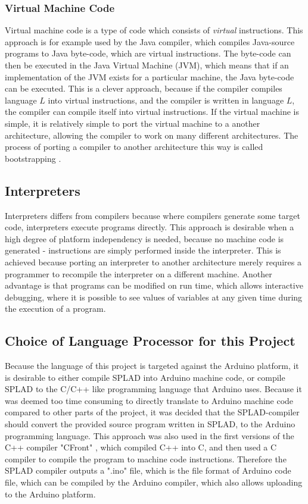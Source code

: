 \subsubsection{Virtual Machine Code} 
Virtual machine code is a type of code which consists of \emph{virtual} instructions. This approach is for example used by the Java compiler, which compiles Java-source programs to Java byte-code, which are virtual instructions. The byte-code can then be executed in the Java Virtual Machine (JVM), which means that if an implementation of the JVM exists for a particular machine, the Java byte-code can be executed. This is a clever approach, because if the compiler compiles language $L$ into virtual instructions, and the compiler is written in language $L$, the compiler can compile itself into virtual instructions. If the virtual machine is simple, it is relatively simple to port the virtual machine to a another architecture, allowing the compiler to work on many different architectures. The process of porting a compiler to another architecture this way is called bootstrapping \citep{CraftingACompiler}. 

\subsection{Interpreters}
Interpreters differs from compilers because where compilers generate some target code, interpreters execute programs directly. This approach is desirable when a high degree of platform independency is needed, because no machine code is generated - instructions are simply performed inside the interpreter. This is achieved because porting an interpreter to another architecture merely requires a programmer to recompile the interpreter on a different machine. Another advantage is that programs can be modified on run time, which allows interactive debugging, where it is possible to see values of variables at any given time during the execution of a program. 

\subsection{Choice of Language Processor for this Project}
Because the language of this project is targeted against the Arduino platform, it is desirable to either compile SPLAD into Arduino machine code, or compile SPLAD to the C/C++ like programming language that Arduino uses. Because it was deemed too time consuming to directly translate to Arduino machine code compared to other parts of the project, it was decided that the SPLAD-compiler should convert the provided source program written in SPLAD, to the Arduino programming language. This approach was also used in the first versions of the C++ compiler "CFront" \citep{sebesta}, which compiled C++ into C, and then used a C compiler to compile the program to machine code instructions. Therefore the SPLAD compiler outputs a  ".ino" file, which is the file format of Arduino code file, which can be compiled by the Arduino compiler, which also allows uploading to the Arduino platform. 